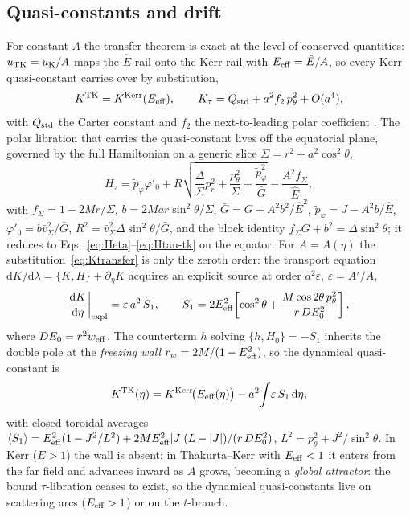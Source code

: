 \documentclass[12pt]{iopart}
\newcommand{\Ehat}{\hat E}
\newcommand{\dd}{\mathrm{d}}
\begin{document}
\subsection{Quasi-constants and drift}
\label{sec:quasiconst}
For constant $A$ the transfer theorem is exact at the level of conserved
quantities: $u_{\rm TK}=u_{\rm K}/A$ maps the $\Ehat$-rail onto the Kerr rail with
$E_{\rm eff}=\Ehat/A$, so every Kerr quasi-constant carries over by substitution,
\begin{equation}
    K^{\rm TK}=K^{\rm Kerr}(E_{\rm eff}),\qquad
    K_\tau=Q_{\rm std}+a^2 f_2\,p_\theta^2+O(a^4),
    \label{eq:Ktransfer}
\end{equation}
with $Q_{\rm std}$ the Carter constant and $f_2$ the next-to-leading polar
coefficient \cite{Carter1968,RosignoliKerr}. The polar libration that carries the
quasi-constant lives off the equatorial plane, governed by the full Hamiltonian
on a generic slice $\Sigma=r^2+a^2\cos^2\theta$,
\begin{equation}
    H_\tau=\tilde p_\varphi\varphi'_0
      +R\sqrt{\frac{\Delta}{\Sigma}p_r^2+\frac{p_\theta^2}{\Sigma}
      +\frac{\tilde p_\varphi^2}{\bar G}}-\frac{A^2 f_\Sigma}{\Ehat},
    \label{eq:H3d}
\end{equation}
with $f_\Sigma=1-2Mr/\Sigma$, $b=2Mar\sin^2\theta/\Sigma$,
$\bar G=G+A^2 b^2/\Ehat^2$, $\tilde p_\varphi=J-A^2 b/\Ehat$,
$\varphi'_0=b\bar v_\Sigma^2/\bar G$, $R^2=\bar v_\Sigma^2\Delta\sin^2\theta/\bar G$,
and the block identity $f_\Sigma G+b^2=\Delta\sin^2\theta$; it reduces to
Eqs.~\eqref{eq:Heta}--\eqref{eq:Htau-tk} on the equator. For $A=A(\eta)$ the
substitution~\eqref{eq:Ktransfer} is only the zeroth order: the transport equation
$\dd K/\dd\lambda=\{K,H\}+\partial_\eta K$ acquires an explicit source at order
$a^2\varepsilon$, $\varepsilon=A'/A$,
\begin{equation}
    \frac{\dd K}{\dd\eta}\bigg|_{\rm expl}=\varepsilon\,a^2\,S_1,\qquad
    S_1=2E_{\rm eff}^2\!\left[\cos^2\theta
        +\frac{M\cos2\theta\,p_\theta^2}{r\,DE_0^2}\right],
    \label{eq:S1}
\end{equation}
where $DE_0=r^2 w_{\rm eff}$. The counterterm $h$ solving $\{h,H_0\}=-S_1$
inherits the double pole at the \emph{freezing wall}
$r_w=2M/(1-E_{\rm eff}^2)$, so the dynamical quasi-constant is
\begin{equation}
    K^{\rm TK}(\eta)=K^{\rm Kerr}\!\big(E_{\rm eff}(\eta)\big)
        -a^2\!\int\!\varepsilon\,S_1\,\dd\eta,
    \label{eq:Kdyn}
\end{equation}
with closed toroidal averages
$\langle S_1\rangle=E_{\rm eff}^2(1-J^2/L^2)
+2ME_{\rm eff}^2|J|(L-|J|)/(r\,DE_0^2)$, $L^2=p_\theta^2+J^2/\sin^2\theta$. In
Kerr ($E>1$) the wall is absent; in Thakurta--Kerr with $E_{\rm eff}<1$ it enters
from the far field and advances inward as $A$ grows, becoming a \emph{global
attractor}: the bound $\tau$-libration ceases to exist, so the dynamical
quasi-constants live on scattering arcs ($E_{\rm eff}>1$) or on the $t$-branch.
\end{document}
